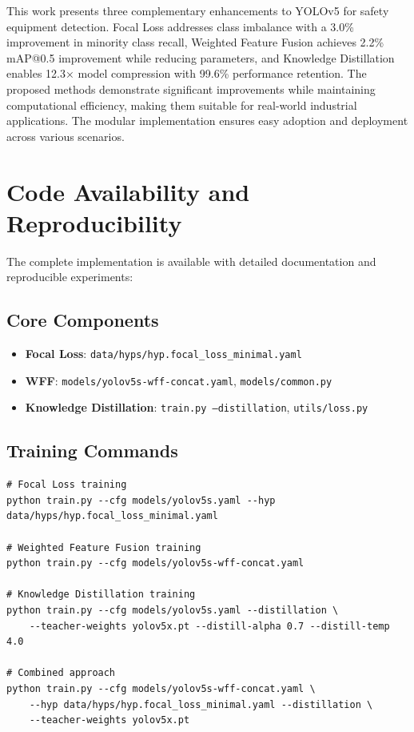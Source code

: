\documentclass[journal]{IEEEtran}
\begin{document}
This work presents three complementary enhancements to YOLOv5 for safety equipment detection. Focal Loss addresses class imbalance with a 3.0\% improvement in minority class recall, Weighted Feature Fusion achieves 2.2\% mAP@0.5 improvement while reducing parameters, and Knowledge Distillation enables 12.3× model compression with 99.6\% performance retention. The proposed methods demonstrate significant improvements while maintaining computational efficiency, making them suitable for real-world industrial applications. The modular implementation ensures easy adoption and deployment across various scenarios.

\section{Code Availability and Reproducibility}

The complete implementation is available with detailed documentation and reproducible experiments:

\subsection{Core Components}
\begin{itemize}
\item \textbf{Focal Loss}: \texttt{data/hyps/hyp.focal\_loss\_minimal.yaml}
\item \textbf{WFF}: \texttt{models/yolov5s-wff-concat.yaml}, \texttt{models/common.py}
\item \textbf{Knowledge Distillation}: \texttt{train.py --distillation}, \texttt{utils/loss.py}
\end{itemize}

\subsection{Training Commands}
\begin{lstlisting}[caption=Reproduction Commands]
# Focal Loss training
python train.py --cfg models/yolov5s.yaml --hyp data/hyps/hyp.focal_loss_minimal.yaml

# Weighted Feature Fusion training
python train.py --cfg models/yolov5s-wff-concat.yaml

# Knowledge Distillation training
python train.py --cfg models/yolov5s.yaml --distillation \
    --teacher-weights yolov5x.pt --distill-alpha 0.7 --distill-temp 4.0

# Combined approach
python train.py --cfg models/yolov5s-wff-concat.yaml \
    --hyp data/hyps/hyp.focal_loss_minimal.yaml --distillation \
    --teacher-weights yolov5x.pt
\end{lstlisting}
\end{document}
